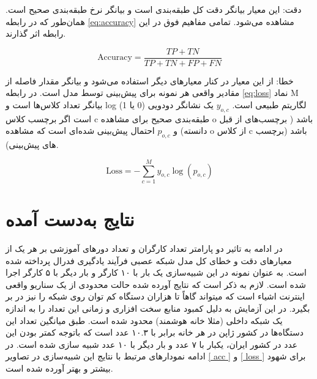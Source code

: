 دقت: این معیار بیانگر دقت کل طبقه‌بندی است و بیانگر نرخ طبقه‌بندی صحیح است. همان‌طور که در رابطه \ref{eq:accuracy} مشاهده می‌شود. تمامی مفاهیم فوق در این رابطه اثر گذارند.

\begin{equation}
    \label{eq:accuracy}
    \text{Accuracy} = \frac{TP+TN}{TP+TN+FP+FN}
\end{equation}




خطا: از این معیار در کنار معیارهای دیگر استفاده می‌شود و بیانگر مقدار فاصله از مقادیر واقعی هر نمونه برای پیش‌بینی توسط مدل است. در رابطه \ref{eq:loss} نماد M بیانگر تعداد کلاس‌ها است و log لگاریتم طبیعی است.  $y_{o,c}$ یک نشانگر دودویی (0 یا 1) است اگر برچسب کلاس c طبقه‌بندی صحیح برای مشاهده o باشد ( برچسب‌های از قبل دانسته) و $p_{o,c}$ احتمال پیش‌بینی شده‌ای است که مشاهده o از کلاس c باشد (برچسب های پیش‌بینی).

\begin{equation} 
\label{eq:loss} 
\text{Loss}=-\sum_{c=1}^My_{o,c}\log(p_{o,c}) 
\end{equation}

\section{نتایج به‌دست آمده}

در ادامه به تاثیر دو پارامتر تعداد کارگران و تعداد دور‌های آموزشی بر هر یک از معیار‌های دقت و خطای کل مدل شبکه عصبی فرآیند یادگیری فدرال پرداخته شده است. به عنوان نمونه در این شبیه‌سازی یک‌ بار با ۱۰ کارگر و بار دیگر با ۵ کارگر اجرا شده است. لازم به ذکر است که نتایج آورده شده حالت محدودی از یک سناریو واقعی اینترنت اشیاء است که میتواند گاهاً تا هزاران دستگاه کم توان روی شبکه را نیز در بر بگیرد. در این آزمایش به دلیل کمبود منابع سخت افزاری و زمانی این تعداد را به اندازه یک شبکه داخلی (مثلا خانه هوشمند) محدود شده‌ است. طبق \cite{b12} میانگین تعداد این دستگاه‌ها در کشور ژاپن در هر خانه برابر با ۱۰.۳ عدد است که باتوجه کمتر بودن این عدد در کشور ایران، یکبار با ۷ عدد و بار دیگر با ۱۰ عدد شبیه ‌سازی شده است. در ادامه نمودار‌های مرتبط با نتایج این شبیه‌سازی در تصاویر \ref{ acc } و \ref{ loss } برای شهود بیشتر و بهتر آورده شده است.

